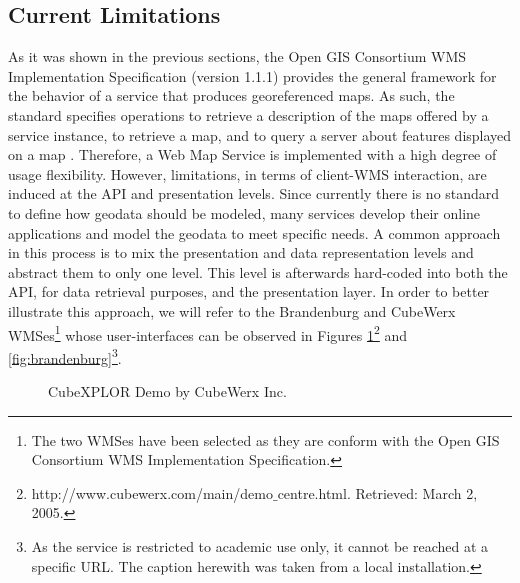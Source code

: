 \documentclass[a4paper,11pt,openany,notitlepage]{article}
\begin{document}
\subsection{Current Limitations} \label{subsec:limitations}
\indent

As it was shown in the previous sections, the Open GIS Consortium WMS Implementation Specification (version 1.1.1) provides the general framework for the behavior of a service that produces georeferenced maps. As such, the standard specifies operations to retrieve a description of the maps offered by a service instance, to retrieve a map, and to query a server about features displayed on a map \cite{ogc}. Therefore, a Web Map Service is implemented with a high degree of usage flexibility. However, limitations, in terms of client-WMS interaction, are induced at the API and presentation levels. Since currently there is no standard to define how geodata should be modeled, many services develop their online applications and model the geodata to meet specific needs. A common approach in this process is to mix the presentation and data representation levels and abstract them to only one level. This level is afterwards hard-coded into both the API, for data retrieval purposes, and the presentation layer. In order to better illustrate this approach, we will refer to the Brandenburg and CubeWerx WMSes\footnote{The two WMSes have been selected as they are conform with the Open GIS Consortium WMS Implementation Specification.} whose user-interfaces can be observed in Figures \ref{fig:cubewerx}\footnote{http://www.cubewerx.com/main/demo$\_$centre.html. Retrieved: March 2, 2005.} and \ref{fig:brandenburg}\footnote{As the service is restricted to academic use only, it cannot be reached at a specific URL. The caption herewith was taken from a local installation.}.
\begin{figure}[h]
	\centering	
		\caption{CubeXPLOR Demo by CubeWerx Inc.}
	\label{fig:cubewerx}	
\end{figure}
\end{document}
